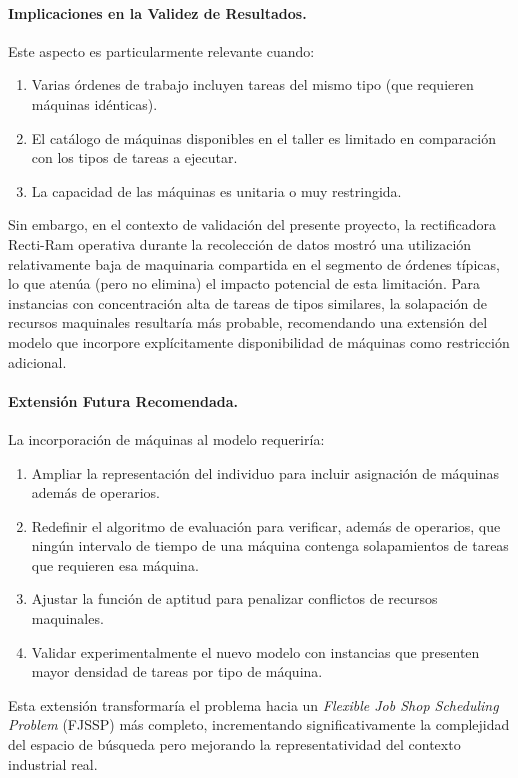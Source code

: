 \paragraph{Implicaciones en la Validez de Resultados.} Este aspecto es particularmente relevante cuando:

\begin{enumerate}
    \item Varias órdenes de trabajo incluyen tareas del mismo tipo (que requieren máquinas idénticas).
    \item El catálogo de máquinas disponibles en el taller es limitado en comparación con los tipos de tareas a ejecutar.
    \item La capacidad de las máquinas es unitaria o muy restringida.
\end{enumerate}

Sin embargo, en el contexto de validación del presente proyecto, la rectificadora Recti-Ram operativa durante la recolección de datos mostró una utilización relativamente baja de maquinaria compartida en el segmento de órdenes típicas, lo que atenúa (pero no elimina) el impacto potencial de esta limitación. Para instancias con concentración alta de tareas de tipos similares, la solapación de recursos maquinales resultaría más probable, recomendando una extensión del modelo que incorpore explícitamente disponibilidad de máquinas como restricción adicional.

\paragraph{Extensión Futura Recomendada.} La incorporación de máquinas al modelo requeriría:

\begin{enumerate}
    \item Ampliar la representación del individuo para incluir asignación de máquinas además de operarios.
    \item Redefinir el algoritmo de evaluación para verificar, además de operarios, que ningún intervalo de tiempo de una máquina contenga solapamientos de tareas que requieren esa máquina.
    \item Ajustar la función de aptitud para penalizar conflictos de recursos maquinales.
    \item Validar experimentalmente el nuevo modelo con instancias que presenten mayor densidad de tareas por tipo de máquina.
\end{enumerate}

Esta extensión transformaría el problema hacia un \textit{Flexible Job Shop Scheduling Problem} (FJSSP) más completo, incrementando significativamente la complejidad del espacio de búsqueda pero mejorando la representatividad del contexto industrial real.
